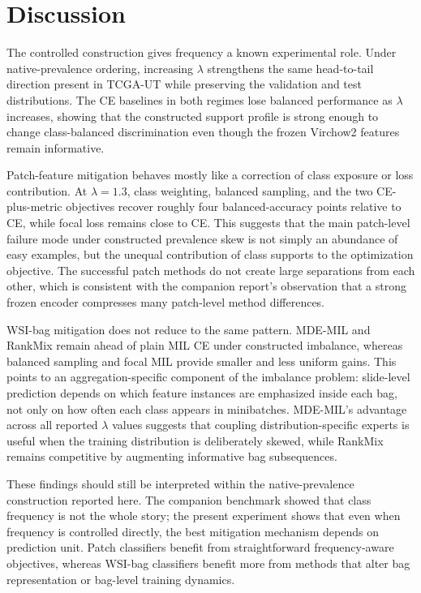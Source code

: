 \documentclass[11pt]{article}
\begin{document}
\section{Discussion}
\label{sec:discussion}
The controlled construction gives frequency a known experimental role. Under native-prevalence ordering, increasing $\lambda$ strengthens the same head-to-tail direction present in TCGA-UT while preserving the validation and test distributions. The CE baselines in both regimes lose balanced performance as $\lambda$ increases, showing that the constructed support profile is strong enough to change class-balanced discrimination even though the frozen Virchow2 features remain informative.

Patch-feature mitigation behaves mostly like a correction of class exposure or loss contribution. At $\lambda=1.3$, class weighting, balanced sampling, and the two CE-plus-metric objectives recover roughly four balanced-accuracy points relative to CE, while focal loss remains close to CE. This suggests that the main patch-level failure mode under constructed prevalence skew is not simply an abundance of easy examples, but the unequal contribution of class supports to the optimization objective. The successful patch methods do not create large separations from each other, which is consistent with the companion report's observation that a strong frozen encoder compresses many patch-level method differences.

WSI-bag mitigation does not reduce to the same pattern. MDE-MIL and RankMix remain ahead of plain MIL CE under constructed imbalance, whereas balanced sampling and focal MIL provide smaller and less uniform gains. This points to an aggregation-specific component of the imbalance problem: slide-level prediction depends on which feature instances are emphasized inside each bag, not only on how often each class appears in minibatches. MDE-MIL's advantage across all reported $\lambda$ values suggests that coupling distribution-specific experts is useful when the training distribution is deliberately skewed, while RankMix remains competitive by augmenting informative bag subsequences.

These findings should still be interpreted within the native-prevalence construction reported here. The companion benchmark showed that class frequency is not the whole story; the present experiment shows that even when frequency is controlled directly, the best mitigation mechanism depends on prediction unit. Patch classifiers benefit from straightforward frequency-aware objectives, whereas WSI-bag classifiers benefit more from methods that alter bag representation or bag-level training dynamics.
\end{document}
